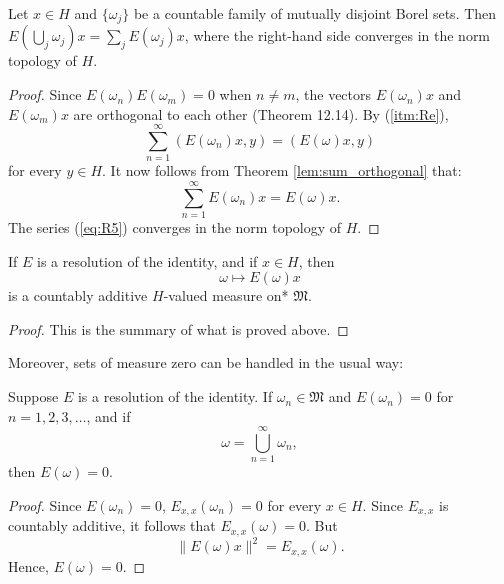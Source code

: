 \begin{lemma}
  \label{lem:resId_iSum}
  Let $x \in H$ and $\{\omega_j\}$ be a countable family of mutually disjoint Borel sets.
  Then $E(\bigcup_j \omega_j)x = \sum_j E(\omega_j)x$, where
  the right-hand side converges in the norm topology of $H$.
\end{lemma}

\begin{proof}
  Since \( E(\omega_n)E(\omega_m) = 0 \) when \( n \neq m \), the vectors \( E(\omega_n)x \) and \( E(\omega_m)x \)
  are orthogonal to each other (Theorem 12.14).
  By (\ref{itm:Re}),
  \begin{equation}
    \label{eq:R5}
    \sum_{n=1}^{\infty} (E(\omega_n)x, y) = (E(\omega)x, y)
  \end{equation}
  for every \( y \in H \).
  It now follows from Theorem \ref{lem:sum_orthogonal} that:
  \[
    \sum_{n=1}^{\infty} E(\omega_n)x = E(\omega)x.
  \]
  The series (\eqref{eq:R5}) converges in the norm topology of \( H \).
\end{proof}

\begin{proposition}[Rudin 12.18]
  \label{thm:resId_vectorMeasure}
  If \( E \) is a resolution of the identity, and if \( x \in H \), then
  \[
    \omega \mapsto E(\omega)x
  \]
  is a countably additive \( H \)-valued measure on* \( \mathfrak{M} \).
\end{proposition}

\begin{proof}
  This is the summary of what is proved above.
\end{proof}

Moreover, sets of measure zero can be handled in the usual way:

\begin{proposition}[Rudin 12.19]
  \label{thm:resId_of_zero}
  Suppose \( E \) is a resolution of the identity.
  If \( \omega_n \in \mathfrak{M} \) and \( E(\omega_n) = 0 \) for \( n = 1,2,3,\dots \), and if
  \[
    \omega = \bigcup_{n=1}^{\infty} \omega_n,
  \]
  then \( E(\omega) = 0 \).
\end{proposition}

\begin{proof}
  Since \( E(\omega_n) = 0 \), \( E_{x,x}(\omega_n) = 0 \) for every \( x \in H \).
  Since \( E_{x,x} \) is countably additive, it follows that \( E_{x,x}(\omega) = 0 \).
  But
  \[
    \|E(\omega)x\|^2 = E_{x,x}(\omega).
  \]
  Hence, \( E(\omega) = 0 \).
\end{proof}


